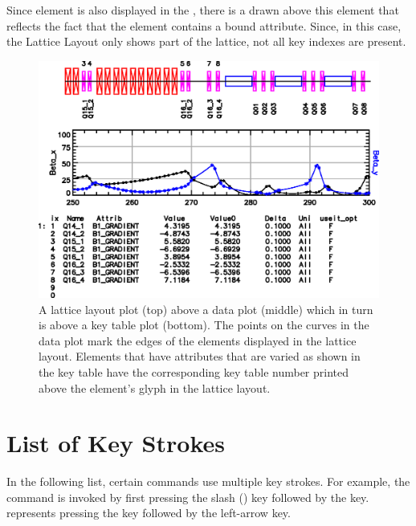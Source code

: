 {Since element  is also displayed in the ,
there is a  drawn above this element that reflects the fact
that the element contains a bound attribute. Since, in this case, the
Lattice Layout only shows part of the lattice, not all key indexes are
present.


\begin{figure}
  \centering
  \includegraphics[width=5in]{layout-graph-table.eps}
  \caption[Example key table with a lattice layout and data plots.]
{A lattice layout plot (top) above a data plot (middle) 
which in turn is above a key table plot (bottom). The points on the
curves in the data plot mark the edges of the elements displayed in
the lattice layout. Elements that have attributes that are varied as
shown in the key table have the corresponding key table number printed
above the element's glyph in the lattice layout.}
  \label{f:key.table}
\end{figure}

\section{List of Key Strokes}
\label{s:keys}

In the following list, certain commands use multiple key strokes. For
example, the  command is invoked by first pressing the slash
() key followed by the  key. 
represents pressing the  key followed by the left-arrow key.

}

